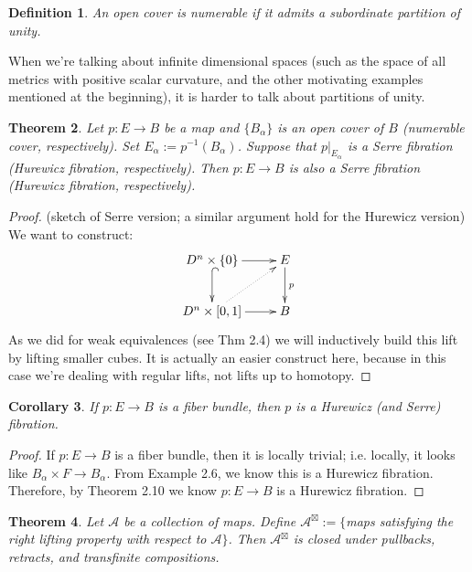 \documentclass{article}
\newtheorem{theorem}{Theorem}[section]
\newtheorem{corollary}[theorem]{Corollary}
\newtheorem{definition}[theorem]{Definition}
\newtheorem{proposed work}[theorem]{Proposed Work}
\newcommand{\xymat}[1]{\begin{align*}\xymatrix{ #1}\end{align*}}
\begin{document}
\begin{definition}
An open cover is numerable if it admits a subordinate partition of unity.
\end{definition}

When we're talking about infinite dimensional spaces (such as the space of all metrics with positive scalar curvature, and the other motivating examples mentioned at the beginning), it is harder to talk about partitions of unity.


\begin{theorem}
Let $p:E\to B$ be a map and $\lbrace B_\alpha\rbrace$ is an open cover of $B$ (numerable cover, respectively). Set $E_\alpha:=p^{-1}(B_\alpha)$. Suppose that $p|_{E_\alpha}$ is a Serre fibration (Hurewicz fibration, respectively). Then $p:E\to B$ is also a Serre fibration (Hurewicz fibration, respectively). 
\end{theorem}

\begin{proof}
(sketch of Serre version; a similar argument hold for the Hurewicz version) We want to construct: 
\xymat{D^n\times \lbrace 0\rbrace \ar[r] \ar@{^{(}->}[d] & E \ar[d]^p \\ D^n\times [0,1] \ar[r] \ar@{.>}[ur] & B}
As we did for weak equivalences (see Thm 2.4) we will inductively build this lift by lifting smaller cubes. It is actually an easier construct here, because in this case we're dealing with regular lifts, not lifts up to homotopy. 
\end{proof}

\begin{corollary}
If $p:E\to B$ is a fiber bundle, then $p$ is a Hurewicz (and Serre) fibration.
\end{corollary}
\begin{proof}
If $p:E\to B$ is a fiber bundle, then it is locally trivial; i.e. locally, it looks like $B_\alpha\times F\to B_\alpha$. From Example 2.6, we know this is a Hurewicz fibration. Therefore, by Theorem 2.10 we know $p:E\to B$ is a Hurewicz fibration.
\end{proof}

\begin{theorem}
Let $\mathcal{A}$ be a collection of maps. Define $\mathcal{A}^\boxtimes:=\lbrace$maps satisfying the right lifting property with respect to $\mathcal{A}\rbrace$. Then $\mathcal{A}^\boxtimes$ is closed under pullbacks, retracts, and transfinite compositions. 
\end{theorem}
\end{document}
